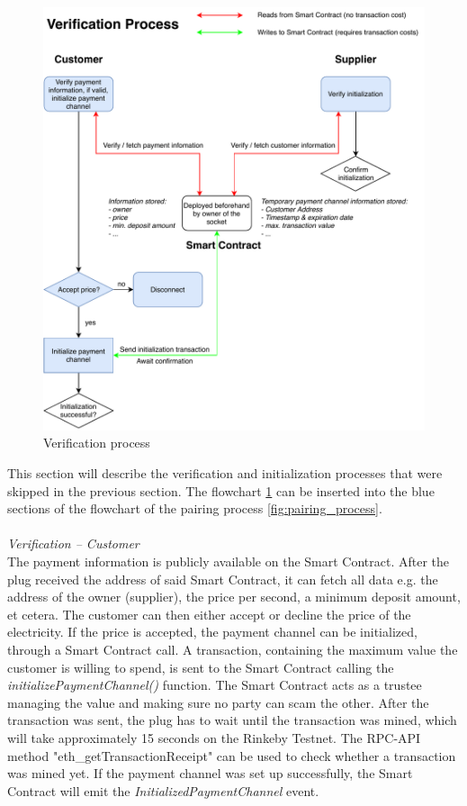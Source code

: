 \begin{figure}[H]
    \includegraphics[width=\textwidth]{img/Plug-Socket-verification_process.pdf}
    \caption{Verification process}
    \label{fig:verification_process}
\end{figure}
This section will describe the verification and initialization processes that were skipped in the previous section. The flowchart \ref{fig:verification_process} can be inserted into the blue sections of the flowchart of the pairing process \ref{fig:pairing_process}.
\\\\
\textit{Verification – Customer}\\
The payment information is publicly available on the Smart Contract. After the plug received the address of said Smart Contract, it can fetch all data e.g. the address of the owner (supplier), the price per second, a minimum deposit amount, et cetera. The customer can then either accept or decline the price of the electricity. If the price is accepted, the payment channel can be initialized, through a Smart Contract call. A transaction, containing the maximum value the customer is willing to spend, is sent to the Smart Contract calling the \textit{initializePaymentChannel()} function. The Smart Contract acts as a trustee managing the value and making sure no party can scam the other. After the transaction was sent, the plug has to wait until the transaction was mined, which will take approximately 15 seconds on the Rinkeby Testnet. The RPC-API method "eth\_getTransactionReceipt" can be used to check whether a transaction was mined yet. If the payment channel was set up successfully, the Smart Contract will emit the \textit{InitializedPaymentChannel} event.
